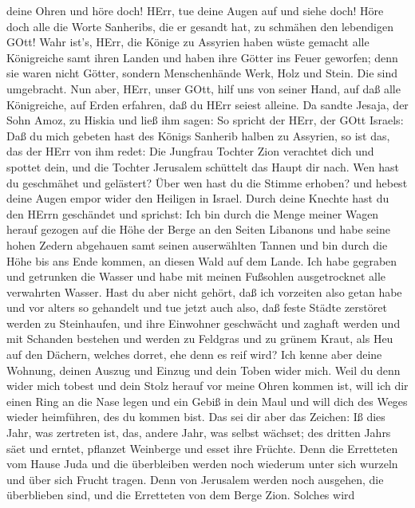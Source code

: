 deine Ohren und höre doch! HErr, tue deine Augen auf und siehe doch!
Höre doch alle die Worte Sanheribs, die er gesandt hat, zu schmähen den
lebendigen GOtt!  Wahr ist's, HErr, die Könige zu Assyrien
haben wüste gemacht alle Königreiche samt ihren Landen  und
haben ihre Götter ins Feuer geworfen; denn sie waren nicht Götter,
sondern Menschenhände Werk, Holz und Stein. Die sind umgebracht.
 Nun aber, HErr, unser GOtt, hilf uns von seiner Hand, auf
daß alle Königreiche, auf Erden erfahren, daß du HErr seiest alleine.
 Da sandte Jesaja, der Sohn Amoz, zu Hiskia und ließ ihm
sagen: So spricht der HErr, der GOtt Israels: Daß du mich gebeten hast
des Königs Sanherib halben zu Assyrien,  so ist das, das
der HErr von ihm redet: Die Jungfrau Tochter Zion verachtet dich und
spottet dein, und die Tochter Jerusalem schüttelt das Haupt dir nach.
 Wen hast du geschmähet und gelästert? Über wen hast du die
Stimme erhoben? und hebest deine Augen empor wider den Heiligen in
Israel.  Durch deine Knechte hast du den HErrn geschändet
und sprichst: Ich bin durch die Menge meiner Wagen herauf gezogen auf
die Höhe der Berge an den Seiten Libanons und habe seine hohen Zedern
abgehauen samt seinen auserwählten Tannen und bin durch die Höhe bis ans
Ende kommen, an diesen Wald auf dem Lande.  Ich habe
gegraben und getrunken die Wasser und habe mit meinen Fußsohlen
ausgetrocknet alle verwahrten Wasser.  Hast du aber nicht
gehört, daß ich vorzeiten also getan habe und vor alters so gehandelt
und tue jetzt auch also, daß feste Städte zerstöret werden zu
Steinhaufen,  und ihre Einwohner geschwächt und zaghaft
werden und mit Schanden bestehen und werden zu Feldgras und zu grünem
Kraut, als Heu auf den Dächern, welches dorret, ehe denn es reif wird?
 Ich kenne aber deine Wohnung, deinen Auszug und Einzug und
dein Toben wider mich.  Weil du denn wider mich tobest und
dein Stolz herauf vor meine Ohren kommen ist, will ich dir einen Ring an
die Nase legen und ein Gebiß in dein Maul und will dich des Weges wieder
heimführen, des du kommen bist.  Das sei dir aber das
Zeichen: Iß dies Jahr, was zertreten ist, das, andere Jahr, was selbst
wächset; des dritten Jahrs säet und erntet, pflanzet Weinberge und esset
ihre Früchte.  Denn die Erretteten vom Hause Juda und die
überbleiben werden noch wiederum unter sich wurzeln und über sich Frucht
tragen.  Denn von Jerusalem werden noch ausgehen, die
überblieben sind, und die Erretteten von dem Berge Zion. Solches wird
